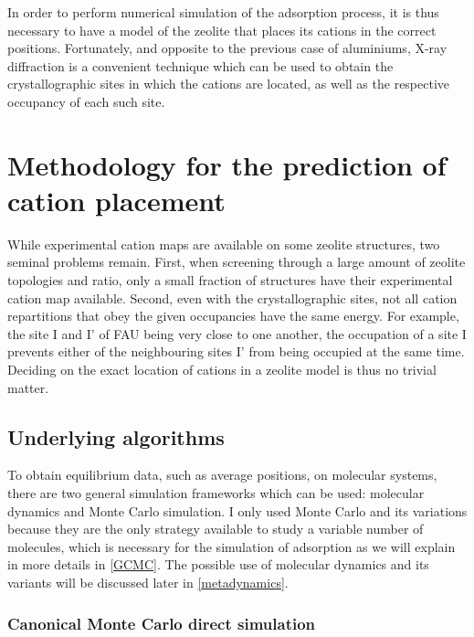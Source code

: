 \documentclass[main.tex]{subfiles}
\begin{document}
In order to perform numerical simulation of the adsorption process, it is thus necessary to have a model of the zeolite that places its cations in the correct positions. Fortunately, and opposite to the previous case of aluminiums, X-ray diffraction is a convenient technique which can be used to obtain the crystallographic sites in which the cations are located, as well as the respective occupancy of each such site.


\section{Methodology for the prediction of cation placement}

While experimental cation maps are available on some zeolite structures, two seminal problems remain. First, when screening through a large amount of zeolite topologies and \SiAl ratio, only a small fraction of structures have their experimental cation map available. Second, even with the crystallographic sites, not all cation repartitions that obey the given occupancies have the same energy. For example, the site I and I' of FAU being very close to one another, the occupation of a site I prevents either of the neighbouring sites I' from being occupied at the same time. Deciding on the exact location of cations in a zeolite model is thus no trivial matter.

\subsection{Underlying algorithms}

To obtain equilibrium data, such as average positions, on molecular systems, there are two general simulation frameworks which can be used: molecular dynamics and Monte Carlo simulation. I only used Monte Carlo and its variations because they are the only strategy available to study a variable number of molecules, which is necessary for the simulation of adsorption as we will explain in more details in \cref{GCMC}. The possible use of molecular dynamics and its variants will be discussed later in \cref{metadynamics}.

\subsubsection{Canonical Monte Carlo direct simulation}
\end{document}
